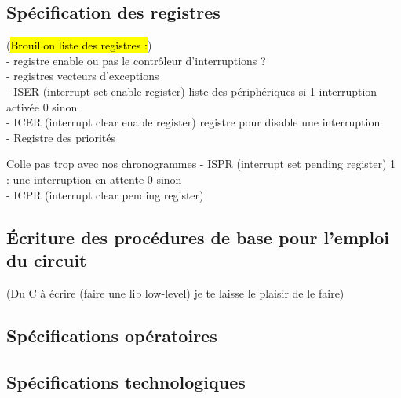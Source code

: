 \subsection{Spécification des registres}

(\hl{Brouillon liste des registres :})\\
- registre enable ou pas le contrôleur d'interruptions ?\\
- registres vecteurs d'exceptions\\
- ISER (interrupt set enable register) liste des périphériques si 1 interruption activée 0 sinon\\
- ICER (interrupt clear enable register) registre pour disable une interruption\\
- Registre des priorités

Colle pas trop avec nos chronogrammes
- ISPR (interrupt set pending register) 1 : une interruption en attente 0 sinon\\
- ICPR (interrupt clear pending register)\\

\subsection{Écriture des procédures de base pour l'emploi du circuit}

(Du C à écrire (faire une lib low-level) je te laisse le plaisir de le faire)\\

\subsection{Spécifications opératoires}
\subsection{Spécifications technologiques}